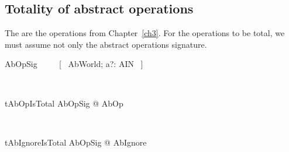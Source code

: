 \subsection{Totality of abstract operations}\label{ch8.specproof-ab-total}

The are the operations from Chapter~\ref{ch3}.
For the operations to be total, we must assume not
only the abstract operations signature.
\begin{LNewSDef}
\begin{zed}
   AbOpSig ~~~~ [~ AbWorld; a?: AIN ~]
\end{zed}~\end{LNewSDef}

\begin{LNewThm}
\begin{theorem}{tAbOpIsTotal}
   \forall AbOpSig @ \pre AbOp
\end{theorem}~\end{LNewThm}

\begin{LThm}
\begin{theorem}{tAbIgnoreIsTotal}
   \forall AbOpSig @ \pre AbIgnore
\end{theorem}~\end{LThm}

